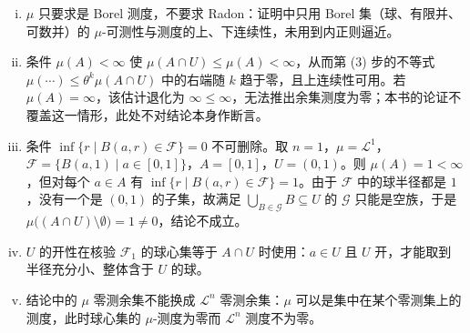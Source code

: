 \documentclass[../../main.tex]{subfiles}%
\begin{document}
\begin{remark}\label{remark:ch01-thm-1-28-条件}
\begin{enumerate}[(i)]
\item $\mu$ 只要求是 Borel 测度，不要求 Radon：证明中只用 Borel 集（球、有限并、可数并）的 $\mu$-可测性与测度的上、下连续性，未用到内正则逼近。
\item 条件 $\mu(A)<\infty$ 使 $\mu(A\cap U)\leqslant\mu(A)<\infty$，从而第 (3) 步的不等式 $\mu(\cdots)\leqslant\theta^{k}\mu(A\cap U)$ 中的右端随 $k$ 趋于零，且上连续性可用。若 $\mu(A)=\infty$，该估计退化为 $\infty\leqslant\infty$，无法推出余集测度为零；本书的论证不覆盖这一情形，此处不对结论本身作断言。
\item 条件 $\inf\{r\mid B(a,r)\in\mathcal{F}\}=0$ 不可删除。取 $n=1$，$\mu=\mathcal{L}^{1}$，$\mathcal{F}=\{B(a,1)\mid a\in[0,1]\}$，$A=[0,1]$，$U=(0,1)$。则 $\mu(A)=1<\infty$，但对每个 $a\in A$ 有 $\inf\{r\mid B(a,r)\in\mathcal{F}\}=1$。由于 $\mathcal{F}$ 中的球半径都是 $1$，没有一个是 $(0,1)$ 的子集，故满足 $\bigcup_{B\in\mathcal{G}}B\subseteq U$ 的 $\mathcal{G}$ 只能是空族，于是 $\mu\bigl((A\cap U)\setminus\emptyset\bigr)=1\neq0$，结论不成立。
\item $U$ 的开性在核验 $\mathcal{F}_1$ 的球心集等于 $A\cap U$ 时使用：$a\in U$ 且 $U$ 开，才能取到半径充分小、整体含于 $U$ 的球。
\item 结论中的 $\mu$ 零测余集不能换成 $\mathcal{L}^n$ 零测余集：$\mu$ 可以是集中在某个零测集上的测度，此时球心集的 $\mu$-测度为零而 $\mathcal{L}^n$ 测度不为零。
\end{enumerate}
\end{remark}
\end{document}
